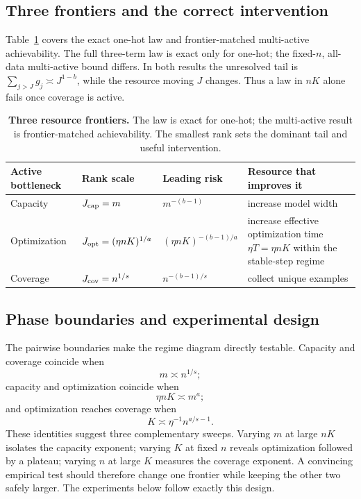 \documentclass[letterpaper]{article}
\begin{document}
\subsection{Three frontiers and the correct intervention}

Table~\ref{tab:regimes} covers the exact one-hot law and frontier-matched
multi-active achievability. The full three-term law is exact only for one-hot;
the fixed-$n$, all-data multi-active bound differs. In both results the
unresolved tail is $\sum_{j>J}g_j\asymp J^{1-b}$, while the resource moving $J$
changes. Thus a law in $nK$ alone fails once coverage is active.

\begin{table}[t]
\centering
\caption{\textbf{Three resource frontiers.} The law is exact for one-hot; the
multi-active result is frontier-matched achievability. The smallest rank sets
the dominant tail and useful intervention.}
\label{tab:regimes}
\begin{tabular}{@{}lll p{}@{}}
\toprule
Active bottleneck & Rank scale & Leading risk & Resource that improves it \\
\midrule
Capacity & $J_{\rm cap}=m$ & $m^{-(b-1)}$ & increase model width \\
Optimization & $J_{\rm opt}=(\eta nK)^{1/a}$ & $(\eta nK)^{-(b-1)/a}$ &
increase effective optimization time $\eta T=\eta nK$ within the stable-step
regime \\
Coverage & $J_{\rm cov}=n^{1/s}$ & $n^{-(b-1)/s}$ & collect unique examples \\
\bottomrule
\end{tabular}
\end{table}

\subsection{Phase boundaries and experimental design}

The pairwise boundaries make the regime diagram directly testable. Capacity and
coverage coincide when
\begin{equation}
m\asymp n^{1/s};
\label{eq:cap-cov-boundary}
\end{equation}
capacity and optimization coincide when
\begin{equation}
\eta nK\asymp m^a;
\label{eq:cap-opt-boundary}
\end{equation}
and optimization reaches coverage when
\begin{equation}
K\asymp\eta^{-1}n^{a/s-1}.
\label{eq:opt-cov-boundary}
\end{equation}
These identities suggest three complementary sweeps. Varying $m$ at large $nK$
isolates the capacity exponent; varying $K$ at fixed $n$ reveals optimization
followed by a plateau; varying $n$ at large $K$ measures the coverage exponent.
A convincing empirical test should therefore change one frontier while keeping
the other two safely larger. The experiments below follow exactly this design.
\end{document}
